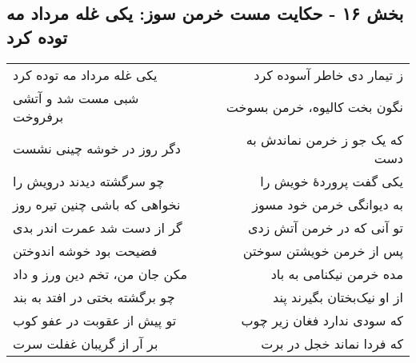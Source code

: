 \begin{center}
\section*{بخش ۱۶ - حکایت مست خرمن سوز: یکی غله مرداد مه توده کرد}
\label{sec:016}
\begin{longtable}{l p{0.5cm} r}
یکی غله مرداد مه توده کرد
&&
ز تیمار دی خاطر آسوده کرد
\\
شبی مست شد و آتشی برفروخت
&&
نگون بخت کالیوه، خرمن بسوخت
\\
دگر روز در خوشه چینی نشست
&&
که یک جو ز خرمن نماندش به دست
\\
چو سرگشته دیدند درویش را
&&
یکی گفت پروردهٔ خویش را
\\
نخواهی که باشی چنین تیره روز
&&
به دیوانگی خرمن خود مسوز
\\
گر از دست شد عمرت اندر بدی
&&
تو آنی که در خرمن آتش زدی
\\
فضیحت بود خوشه اندوختن
&&
پس از خرمن خویشتن سوختن
\\
مکن جان من، تخم دین ورز و داد
&&
مده خرمن نیکنامی به باد
\\
چو برگشته بختی در افتد به بند
&&
از او نیک‌بختان بگیرند پند
\\
تو پیش از عقوبت در عفو کوب
&&
که سودی ندارد فغان زیر چوب
\\
بر آر از گریبان غفلت سرت
&&
که فردا نماند خجل در برت
\\
\end{longtable}
\end{center}
